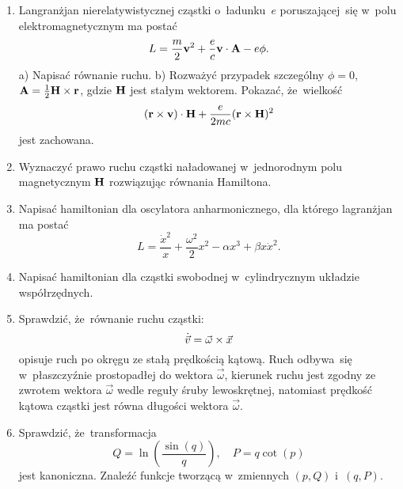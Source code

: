 \documentclass[a4paper,11pt]{article}
\begin{document}
\begin{enumerate}
\item Langranżjan nierelatywistycznej cząstki o~ładunku~$e$ poruszającej~się
  w~polu elektromagnetycznym ma postać
  \begin{equation*}
    L =
    \frac{ m }{ 2 } \mathbf{v}^{ 2 }
    + \frac{ e }{ c } \mathbf{v} \cdot \mathbf{A} - e \phi.
  \end{equation*}
  a) Napisać równanie ruchu.
  b) Rozważyć przypadek szczególny $\phi = 0$,
  $\mathbf{A} = \frac{ 1 }{ 2 } \mathbf{H} \times \mathbf{r}$, gdzie $\mathbf{H}$
  jest stałym wektorem. Pokazać, że~wielkość
  \begin{equation*}
    ( \mathbf{r} \times \mathbf{v} ) \cdot \mathbf{H}
    + \frac{ e }{ 2 mc } ( \mathbf{r} \times \mathbf{H} )^{ 2 }
  \end{equation*}
  jest zachowana.



\item Wyznaczyć prawo ruchu cząstki naładowanej w~jednorodnym polu
  magnetycznym $\mathbf{H}$ rozwiązując równania Hamiltona.



\item Napisać hamiltonian dla oscylatora anharmonicznego, dla którego
  lagranżjan ma postać
  \begin{equation*}
    L =
    \frac{ \dot{x}^{ 2 } }{ x } + \frac{ \omega^{ 2 } }{ 2 } x^{ 2 }
    - \alpha x^{ 3 } + \beta x \dot{x}^{ 2 }.
  \end{equation*}



\item Napisać hamiltonian dla cząstki swobodnej w~cylindrycznym układzie
  współrzędnych.



\item Sprawdzić, że~równanie ruchu cząstki:
  \begin{equation*}
    \dot{\vec{v}} = \vec{\omega} \times \vec{x}
  \end{equation*}
  opisuje ruch po okręgu ze stałą prędkością kątową. Ruch odbywa~się
  w~płaszczyźnie prostopadłej do wektora $\vec{\omega}$, kierunek ruchu jest
  zgodny ze zwrotem wektora $\vec{\omega}$ wedle reguły śruby lewoskrętnej,
  natomiast prędkość kątowa cząstki jest równa długości wektora $\vec{\omega}$.



\item Sprawdzić, że~transformacja
  \begin{equation*}
    Q =     \ln\left( \frac{ \sin( q ) }{ q } \right), \quad
    P = q \cot( p )
  \end{equation*}
  jest kanoniczna. Znaleźć funkcje tworzącą w~zmiennych $( p, Q )$
  i~$( q, P )$.




\end{enumerate}
\end{document}
